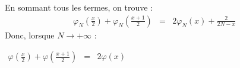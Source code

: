 En sommant tous les termes, on trouve :
\[
  \begin{array}{rcl}
    \varphi_N\left(\frac{x}{2}\right) + \varphi_N\left(\frac{x+1}{2}\right) & = & 2 \varphi_N(x) + \frac{2}{2N-x}
  \end{array}
\]
Donc, lorsque $N \rightarrow +\infty$ :
\begin{result}
  $
    \begin{array}{rcl}
      \varphi\left(\frac{x}{2}\right) + \varphi\left(\frac{x+1}{2}\right) & = & 2 \varphi(x)
    \end{array}
  $
\end{result}
